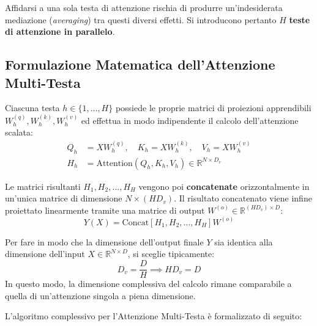 Affidarsi a una sola testa di attenzione rischia di produrre un'indesiderata mediazione (\textit{averaging}) tra questi diversi effetti. Si introducono pertanto $H$ \textbf{teste di attenzione in parallelo}.

\subsection{Formulazione Matematica dell'Attenzione Multi-Testa}
Ciascuna testa $h \in \{1, \dots, H\}$ possiede le proprie matrici di proiezioni apprendibili $W_h^{(q)}, W_h^{(k)}, W_h^{(v)}$ ed effettua in modo indipendente il calcolo dell'attenzione scalata:
\begin{align}
Q_h &= X W_h^{(q)}, \quad K_h = X W_h^{(k)}, \quad V_h = X W_h^{(v)} \\
H_h &= \text{Attention}(Q_h, K_h, V_h) \in \mathbb{R}^{N \times D_v}
\end{align}

Le matrici risultanti $H_1, H_2, \dots, H_H$ vengono poi \textbf{concatenate} orizzontalmente in un'unica matrice di dimensione $N \times (H D_v)$. Il risultato concatenato viene infine proiettato linearmente tramite una matrice di output $W^{(o)} \in \mathbb{R}^{(H D_v) \times D}$:
\begin{equation}
Y(X) = \text{Concat}\left[ H_1, H_2, \dots, H_H \right] W^{(o)} \label{eq:mha_concat}
\end{equation}

Per fare in modo che la dimensione dell'output finale $Y$ sia identica alla dimensione dell'input $X \in \mathbb{R}^{N \times D}$, si sceglie tipicamente:
\begin{equation}
D_v = \frac{D}{H} \implies H D_v = D
\end{equation}
In questo modo, la dimensione complessiva del calcolo rimane comparabile a quella di un'attenzione singola a piena dimensione.



L'algoritmo complessivo per l'Attenzione Multi-Testa è formalizzato di seguito:


